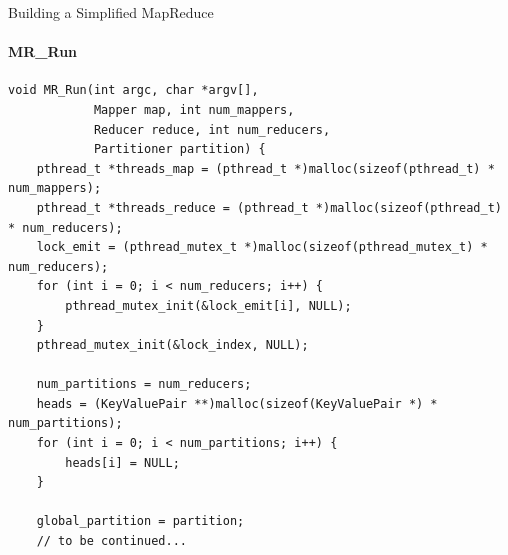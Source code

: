\documentclass[10pt]{beamer}
\begin{document}

\begin{frame}[fragile]{Building a Simplified MapReduce}
    \framesubtitle{MR\_Run}
    \begin{lstlisting}
void MR_Run(int argc, char *argv[],
            Mapper map, int num_mappers,
            Reducer reduce, int num_reducers,
            Partitioner partition) {
    pthread_t *threads_map = (pthread_t *)malloc(sizeof(pthread_t) * num_mappers);
    pthread_t *threads_reduce = (pthread_t *)malloc(sizeof(pthread_t) * num_reducers);
    lock_emit = (pthread_mutex_t *)malloc(sizeof(pthread_mutex_t) * num_reducers);
    for (int i = 0; i < num_reducers; i++) {
        pthread_mutex_init(&lock_emit[i], NULL);
    }
    pthread_mutex_init(&lock_index, NULL);

    num_partitions = num_reducers;
    heads = (KeyValuePair **)malloc(sizeof(KeyValuePair *) * num_partitions);
    for (int i = 0; i < num_partitions; i++) {
        heads[i] = NULL;
    }

    global_partition = partition;
    // to be continued...
\end{lstlisting}
\end{frame}
\end{document}
